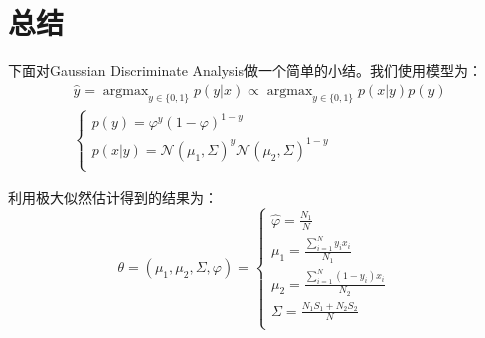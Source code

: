 \documentclass[a4paper]{article}
\begin{document}
\section{总结}
下面对Gaussian Discriminate Analysis做一个简单的小结。我们使用模型为：
\begin{gather}
    \hat{y} = \mathop{\arg\max}_{y\in \{0,1\}}p(y|x) \propto \mathop{\arg\max}_{y\in \{0,1\}}p(x|y)p(y) \\ 
    \left\{
        \begin{array}{ll}
            p(y)= \varphi^y(1-\varphi)^{1-y} & \\
            p(x|y)= \mathcal{N}(\mu_1, \Sigma)^y\mathcal{N}(\mu_2, \Sigma)^{1-y} & \\
        \end{array}
    \right.
\end{gather}

利用极大似然估计得到的结果为：
\begin{equation}
    \theta = (\mu_1,\mu_2,\Sigma,\varphi)=
    \left\{
        \begin{array}{ll}
            \hat{\varphi} = \frac{N_1}{N}  & \\
            \mu_1 = \frac{\sum_{i=1}^N y_i x_i}{N_1} & \\
            \mu_2 = \frac{\sum_{i=1}^N (1-y_i)x_i}{N_2} & \\
            \Sigma = \frac{N_1S_1 + N_2S_2}{N} & \\
        \end{array}
    \right.
\end{equation}
\end{document}
